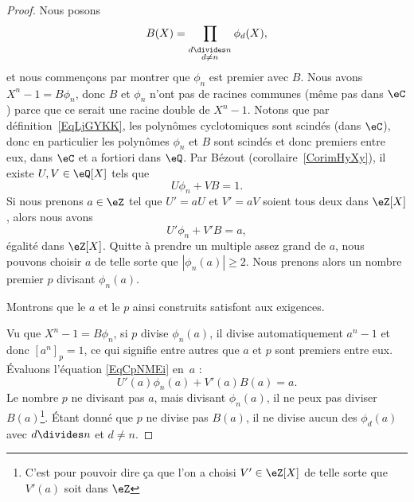 \begin{proof}
    Nous posons
    \begin{equation}
        B(X)=\prod_{_{\substack{d\divides n\\d\neq n}}}\phi_d(X),
    \end{equation}
    et nous commençons par montrer que \( \phi_n\) est premier avec \( B\). Nous avons \( X^n-1=B\phi_n\), donc \( B\) et \( \phi_n\) n'ont pas de racines communes (même pas dans \( \eC\)) parce que ce serait une racine double de \( X^n-1\). Notons que par définition~\ref{EqLjGYKK}, les polynômes cyclotomiques sont scindés (dans \( \eC\)), donc en particulier les polynômes \( \phi_n\) et \( B\) sont scindés et donc premiers entre eux, dans \( \eC\) et a fortiori dans \( \eQ\). Par Bézout (corollaire~\ref{CorimHyXy}), il existe \( U,V\in\eQ[X]\) tels que
    \begin{equation}
        U\phi_n+VB=1.
    \end{equation}
    Si nous prenons \( a\in \eZ\) tel que \( U'=aU\) et \( V'=aV\) soient tous deux dans \( \eZ[X]\), alors nous avons
    \begin{equation}    \label{EqCpNMEi}
        U'\phi_n+V'B=a,
    \end{equation}
    égalité dans \( \eZ[X]\). Quitte à prendre un multiple assez grand de \( a\), nous pouvons choisir \( a\) de telle sorte que \( | \phi_n(a) |\geq 2\). Nous prenons alors un nombre premier \( p\) divisant \( \phi_n(a)\).

    Montrons que le \( a\) et le \( p\) ainsi construits satisfont aux exigences.

    Vu que \( X^n-1=B\phi_n\), si \( p\) divise \( \phi_n(a)\), il divise automatiquement \( a^n-1\) et donc \( [a^n]_p=1\), ce qui signifie entre autres que \( a\) et \( p\) sont premiers entre eux. Évaluons l'équation \eqref{EqCpNMEi} en~\( a\) :
    \begin{equation}
        U'(a)\phi_n(a)+V'(a)B(a)=a.
    \end{equation}
    Le nombre \( p\) ne divisant pas \( a\), mais divisant \( \phi_n(a)\), il ne peux pas diviser \( B(a)\)\footnote{C'est pour pouvoir dire ça que l'on a choisi \( V'\in \eZ[X]\) de telle sorte que \( V'(a)\) soit dans \( \eZ\)}. Étant donné que \( p\) ne divise pas \( B(a)\), il ne divise aucun des \( \phi_d(a)\) avec \( d\divides n\) et \( d\neq n\).


\end{proof}

